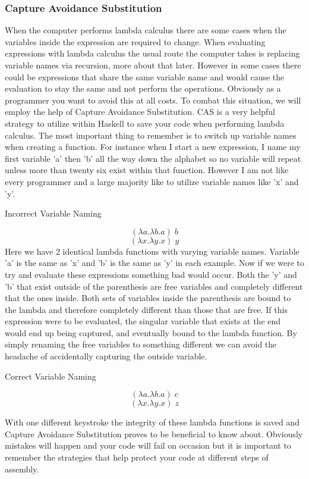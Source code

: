 \documentclass{article}
\begin{document}
        \subsubsection{Capture Avoidance Substitution}
        When the computer performs lambda calculus there are some cases when the variables inside the expression are required to change. When evaluating expressions with lambda calculus the usual route the computer takes is replacing variable names via recursion, more about that later. However in some cases there could be expressions that share the same variable name and would cause the evaluation to stay the same and not perform the operations. Obviously as a programmer you want to avoid this at all costs. To combat this situation, we will employ the help of Capture Avoidance Substitution. CAS is a very helpful strategy to utilize within Haskell to save your code when performing lambda calculus. The most important thing to remember is to switch up variable names when creating a function. For instance when I start a new expression, I name my first variable 'a' then 'b' all the way down the alphabet so no variable will repeat unless more than twenty six exist within that function. However I am not like every programmer and a large majority like to utilize variable names like 'x' and 'y'.
        
        \medskip
        \caption{Incorrect Variable Naming}
        $$(\lambda a. \lambda b. a )\; b$$
        \smallskip 
        $$(\lambda x. \lambda y. x)\; y$$
        \noindent Here we have 2 identical lambda functions with varying variable names. Variable 'a' is the same as 'x' and 'b' is the same as 'y' in each example. Now if we were to try and evaluate these expressions something bad would occur. Both the 'y' and 'b' that exist outside of the parenthesis are free variables and completely different that the ones inside. Both sets of variables inside the parenthesis are bound to the lambda and therefore completely different than those that are free. If this expression were to be evaluated, the singular variable that exists at the end would end up being captured, and eventually bound to the lambda function. By simply renaming the free variables to something different we can avoid the headache of accidentally capturing the outside variable.
        
        \medskip
        \caption{Correct Variable Naming}
        $$(\lambda a. \lambda b.a)\; c$$
        \smallskip
        $$(\lambda x. \lambda y.x) \; z$$
        
        \noindent With one different keystroke the integrity of these lambda functions is saved and Capture Avoidance Substitution proves to be beneficial to know about. Obviously mistakes will happen and your code will fail on occasion but it is important to remember the strategies that help protect your code at different steps of assembly.
        
\end{document}
